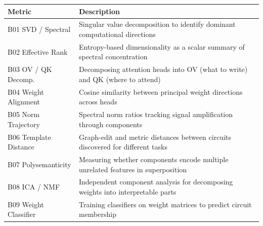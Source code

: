 \documentclass[10pt]{article}
\begin{document}
\begin{minipage}{\linewidth}
\par

\begin{center}

\begin{tabular}{@{}lp{10cm}@{}}
\toprule
\textbf{Metric} & \textbf{Description} \\
\midrule
B01 SVD / Spectral & Singular value decomposition to identify dominant computational directions \\
\midrule
B02 Effective Rank & Entropy-based dimensionality as a scalar summary of spectral concentration \\
\midrule
B03 OV / QK Decomp. & Decomposing attention heads into OV (what to write) and QK (where to attend) \\
\midrule
B04 Weight Alignment & Cosine similarity between principal weight directions across heads \\
\midrule
B05 Norm Trajectory & Spectral norm ratios tracking signal amplification through components \\
\midrule
B06 Template Distance & Graph-edit and metric distances between circuits discovered for different tasks \\
\midrule
B07 Polysemanticity & Measuring whether components encode multiple unrelated features in superposition \\
\midrule
B08 ICA / NMF & Independent component analysis for decomposing weights into interpretable parts \\
\midrule
B09 Weight Classifier & Training classifiers on weight matrices to predict circuit membership \\
\bottomrule
\end{tabular}
\end{center}
\end{minipage}

\smallskip
\end{document}
